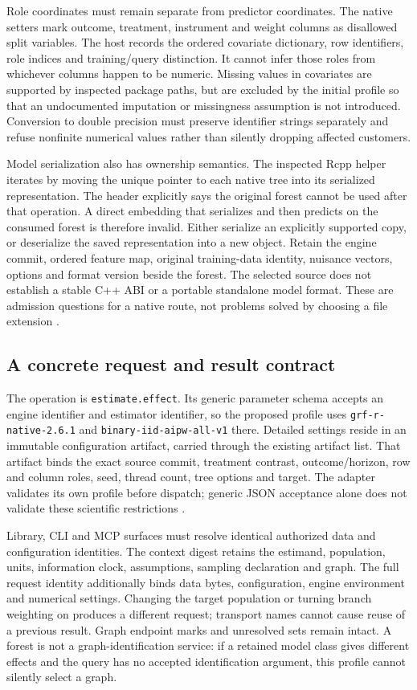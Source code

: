 Role coordinates must remain separate from predictor coordinates. The
native setters mark outcome, treatment, instrument and weight columns as
disallowed split variables. The host records the ordered covariate
dictionary, row identifiers, role indices and training/query
distinction. It cannot infer those roles from whichever columns happen
to be numeric. Missing values in covariates are supported by inspected
package paths, but are excluded by the initial profile so that an
undocumented imputation or missingness assumption is not introduced.
Conversion to double precision must preserve identifier strings
separately and refuse nonfinite numerical values rather than silently
dropping affected customers.

Model serialization also has ownership semantics. The inspected Rcpp
helper iterates by moving the unique pointer to each native tree into
its serialized representation. The header explicitly says the original
forest cannot be used after that operation. A direct embedding that
serializes and then predicts on the consumed forest is therefore
invalid. Either serialize an explicitly supported copy, or deserialize
the saved representation into a new object. Retain the engine commit,
ordered feature map, original training-data identity, nuisance vectors,
options and format version beside the forest. The selected source does
not establish a stable C++ ABI or a portable standalone model format.
These are admission questions for a native route, not problems solved by
choosing a file extension \cite{exec13_grf_memory}.

\subsection{A concrete request and result contract}

The operation is \texttt{estimate.effect}. Its generic parameter schema
accepts an engine identifier and estimator identifier, so the proposed
profile uses \texttt{grf-r-native-2.6.1} and
\texttt{binary-iid-aipw-all-v1} there. Detailed settings reside in an
immutable configuration artifact, carried through the existing artifact
list. That artifact binds the exact source commit, treatment contrast,
outcome/horizon, row and column roles, seed, thread count, tree options
and target. The adapter validates its own profile before dispatch;
generic JSON acceptance alone does not validate these scientific
restrictions \cite{exec13_grf_design}.

Library, CLI and MCP surfaces must resolve identical authorized data and
configuration identities. The context digest retains the estimand,
population, units, information clock, assumptions, sampling declaration
and graph. The full request identity additionally binds data bytes,
configuration, engine environment and numerical settings. Changing the
target population or turning branch weighting on produces a different
request; transport names cannot cause reuse of a previous result. Graph
endpoint marks and unresolved sets remain intact. A forest is not a
graph-identification service: if a retained model class gives different
effects and the query has no accepted identification argument, this
profile cannot silently select a graph.

